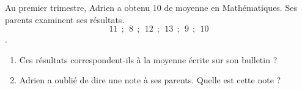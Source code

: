 
Au premier trimestre, Adrien a obtenu 10 de moyenne en Mathématiques. Ses parents examinent ses résultats. $$ 11~~ ; ~~8~~ ; ~~12~~ ; ~~13~~ ; ~~9~~ ; ~~10$$.
\begin{enumerate}
\item Ces résultats correspondent-ils à la moyenne écrite sur son bulletin ?
\item Adrien a oublié de dire une note à ses parents. Quelle est cette note ?
\end{enumerate}